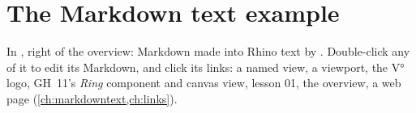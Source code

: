 \section{The Markdown text example}

In , right of the overview: Markdown made into Rhino text by . Double-click any of it to edit its
Markdown, and click its links: a named view, a viewport, the V° logo, GH~11's \emph{Ring} component and canvas
view, lesson 01, the overview, a web page (\cref{ch:markdowntext,ch:links}).
